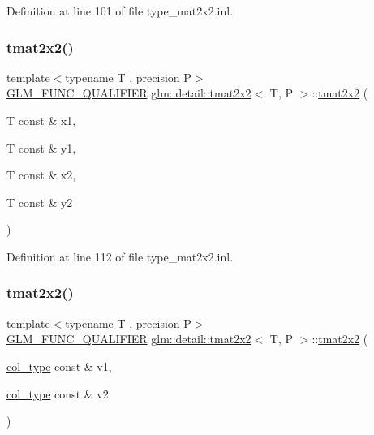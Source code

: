 Definition at line 101 of file type\+\_\+mat2x2.\+inl.

\mbox{\label{structglm_1_1detail_1_1tmat2x2_ac66f031aca7d5f0e52e92b0c9ab664a7}} 
\subsubsection{\texorpdfstring{tmat2x2()}{tmat2x2()}\hspace{0.1cm}{\footnotesize\ttfamily [6/22]}}
{\footnotesize\ttfamily template$<$typename T , precision P$>$ \\
\hyperlink{setup_8hpp_a33fdea6f91c5f834105f7415e2a64407}{G\+L\+M\+\_\+\+F\+U\+N\+C\+\_\+\+Q\+U\+A\+L\+I\+F\+I\+ER} \hyperlink{structglm_1_1detail_1_1tmat2x2}{glm\+::detail\+::tmat2x2}$<$ T, P $>$\+::\hyperlink{structglm_1_1detail_1_1tmat2x2}{tmat2x2} (\begin{DoxyParamCaption}\item[{T const \&}]{x1,  }\item[{T const \&}]{y1,  }\item[{T const \&}]{x2,  }\item[{T const \&}]{y2 }\end{DoxyParamCaption})}



Definition at line 112 of file type\+\_\+mat2x2.\+inl.

\mbox{\label{structglm_1_1detail_1_1tmat2x2_a98263653fc582781e4babe149a4fdd99}} 
\subsubsection{\texorpdfstring{tmat2x2()}{tmat2x2()}\hspace{0.1cm}{\footnotesize\ttfamily [7/22]}}
{\footnotesize\ttfamily template$<$typename T , precision P$>$ \\
\hyperlink{setup_8hpp_a33fdea6f91c5f834105f7415e2a64407}{G\+L\+M\+\_\+\+F\+U\+N\+C\+\_\+\+Q\+U\+A\+L\+I\+F\+I\+ER} \hyperlink{structglm_1_1detail_1_1tmat2x2}{glm\+::detail\+::tmat2x2}$<$ T, P $>$\+::\hyperlink{structglm_1_1detail_1_1tmat2x2}{tmat2x2} (\begin{DoxyParamCaption}\item[{\hyperlink{structglm_1_1detail_1_1tmat2x2_ae8c6de6197aa1b65adf15c40197c04d1}{col\+\_\+type} const \&}]{v1,  }\item[{\hyperlink{structglm_1_1detail_1_1tmat2x2_ae8c6de6197aa1b65adf15c40197c04d1}{col\+\_\+type} const \&}]{v2 }\end{DoxyParamCaption})}



